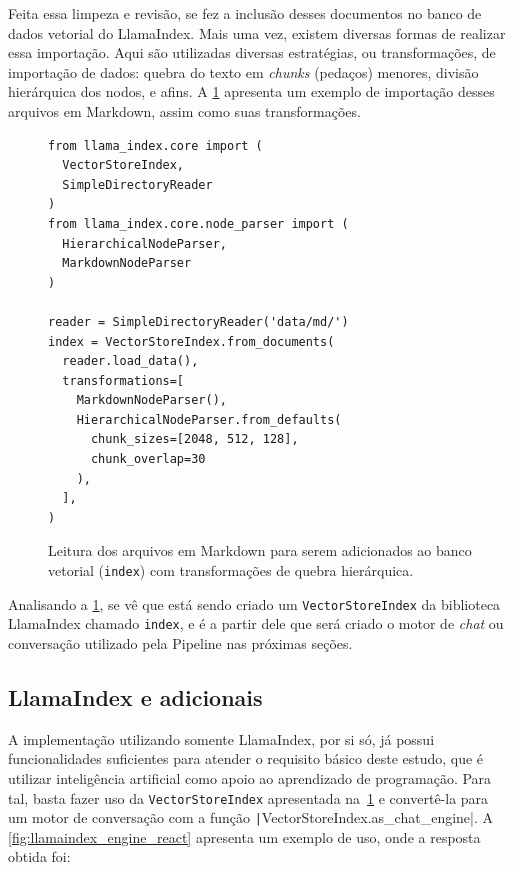 \documentclass[journal]{IEEEtran}
\begin{document}
Feita essa limpeza e revisão, se fez a inclusão desses documentos no banco de dados vetorial do LlamaIndex.
Mais uma vez, existem diversas formas de realizar essa importação.
Aqui são utilizadas diversas estratégias, ou transformações, de importação de dados: quebra do texto em \textit{chunks} (pedaços) menores, divisão hierárquica dos nodos, e afins.
A \cref{fig:llamaindex_md_read} apresenta um exemplo de importação desses arquivos em Markdown, assim como suas transformações.

\begin{figure}[h]
    \centering
    \begin{verbatim}
from llama_index.core import (
  VectorStoreIndex,
  SimpleDirectoryReader
)
from llama_index.core.node_parser import (
  HierarchicalNodeParser,
  MarkdownNodeParser
)

reader = SimpleDirectoryReader('data/md/')
index = VectorStoreIndex.from_documents(
  reader.load_data(),
  transformations=[
    MarkdownNodeParser(),
    HierarchicalNodeParser.from_defaults(
      chunk_sizes=[2048, 512, 128],
      chunk_overlap=30
    ),
  ],
)
    \end{verbatim}
    \caption{%
    Leitura dos arquivos em Markdown para serem adicionados ao banco vetorial (\texttt{index}) com transformações de quebra hierárquica.\label{fig:llamaindex_md_read}}
\end{figure}

Analisando a \cref{fig:llamaindex_md_read}, se vê que está sendo criado um \texttt{VectorStoreIndex} da biblioteca LlamaIndex chamado \texttt{index}, e é a partir dele que será criado o motor de \textit{chat} ou conversação utilizado pela Pipeline nas próximas seções.

\subsection{LlamaIndex e adicionais\label{sec:indo_alem_do_llamaindex}}

\noindent%
A implementação utilizando somente LlamaIndex, por si só, já possui funcionalidades suficientes para atender o requisito básico deste estudo, que é utilizar inteligência artificial como apoio ao aprendizado de programação.
Para tal, basta fazer uso da \texttt{VectorStoreIndex} apresentada na~\cref{fig:llamaindex_md_read} e convertê-la para um motor de conversação com a função \texttt|VectorStoreIndex.as_chat_engine|.
A \cref{fig:llamaindex_engine_react} apresenta um exemplo de uso, onde a resposta obtida foi:
\end{document}
